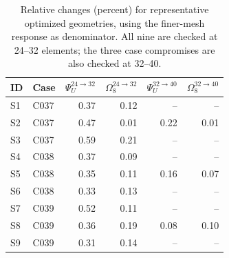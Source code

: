 \begin{table}[t]
\centering
\caption{Relative changes (percent) for representative optimized geometries, using the finer-mesh response as denominator. All nine are checked at 24--32 elements; the three case compromises are also checked at 32--40.}
\label{tab:representative_mesh_convergence}
\begin{tabular}{llrrrr}
\toprule
ID & Case & $\Psi_U^{24\to32}$ & $\Omega_8^{24\to32}$ & $\Psi_U^{32\to40}$ & $\Omega_8^{32\to40}$ \\
\midrule
S1 & C037 & 0.37 & 0.12 & -- & -- \\
S2 & C037 & 0.47 & 0.01 & 0.22 & 0.01 \\
S3 & C037 & 0.59 & 0.21 & -- & -- \\
S4 & C038 & 0.37 & 0.09 & -- & -- \\
S5 & C038 & 0.35 & 0.11 & 0.16 & 0.07 \\
S6 & C038 & 0.33 & 0.13 & -- & -- \\
S7 & C039 & 0.52 & 0.11 & -- & -- \\
S8 & C039 & 0.36 & 0.19 & 0.08 & 0.10 \\
S9 & C039 & 0.31 & 0.14 & -- & -- \\
\bottomrule
\end{tabular}
\end{table}
